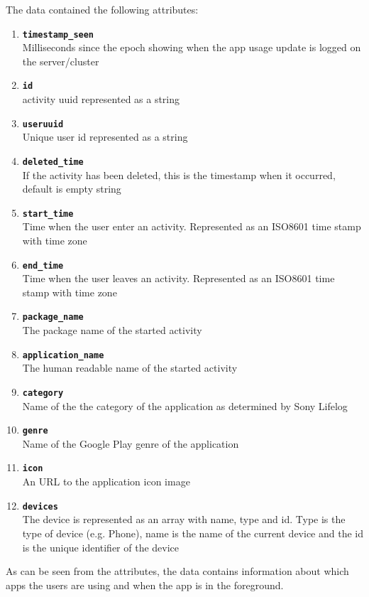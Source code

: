 The data contained the following attributes:
\begin{enumerate}
\item \texttt{\textbf{timestamp\_seen}}\\Milliseconds since the epoch showing when the app usage update is logged on the server/cluster 
\item \texttt{\textbf{id}}\\activity uuid represented as a string  
\item \texttt{\textbf{useruuid}}\\Unique user id represented as a string 
\item \texttt{\textbf{deleted\_time}}\\ If the activity has been deleted, this is the timestamp when it occurred, default is empty string
\item \texttt{\textbf{start\_time}}\\Time when the user enter an activity. Represented as an ISO8601 time stamp with time zone 
\item \texttt{\textbf{end\_time}}\\Time when the user leaves an activity. Represented as an ISO8601 time stamp with time zone
\item \texttt{\textbf{package\_name}}\\ The package name of the started activity
\item \texttt{\textbf{application\_name}}\\The human readable name of the started activity
\item \texttt{\textbf{category}}\\Name of the the category of the application as determined by Sony Lifelog
\item \texttt{\textbf{genre}}\\Name of the Google Play genre of the application
\item \texttt{\textbf{icon}}\\ An URL to the application icon image
\item \texttt{\textbf{devices}}\\The device is represented as an array with name, type and id. Type is the type of device (e.g. Phone), name is the name of the current device and the id is the unique identifier of the device 
\end{enumerate}
As can be seen from the attributes, the data contains information about which apps the users are using and when the app is in the foreground.

